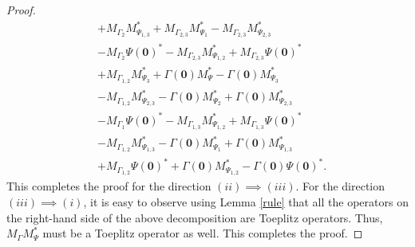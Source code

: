 \documentclass[12pt]{amsart}
\theoremstyle{definition}
\newcommand{\1}{{\mbox{\bf 1}}}
\begin{document}
\begin{proof}
\begin{align*}
&+ M_{\Gamma_2} M_{\Psi_{1,3}}^* + M_{\Gamma_{2,3}} M_{\Psi_{1}}^* - M_{\Gamma_{2,3}}  M_{\Psi_{2,3}}^*\\
&-M_{\Gamma_2} \Psi(\bm{0})^* - M_{\Gamma_{2,3}} M_{\Psi_{1,2}}^* + M_{\Gamma_{2,3}}  \Psi(\bm{0})^*\\
&+M_{\Gamma_{1,2}} M_{\Psi_3}^* + \Gamma(\bm{0}) M_{\Psi}^* - \Gamma(\bm{0}) M_{\Psi_3}^*\\
&-M_{\Gamma_{1,2}} M_{\Psi_{2,3}}^*  - \Gamma(\bm{0}) M_{\Psi_{2}}^* +  \Gamma(\bm{0}) M_{\Psi_{2,3}}^*\\
&-M_{\Gamma_{1}} \Psi(\bm{0})^*  - M_{\Gamma_{1,3}} M_{\Psi_{1,2}}^* +  M_{\Gamma_{1,3}} \Psi(\bm{0})^* \\
&-M_{\Gamma_{1,2}} M_{\Psi_{1,3}}^*  - \Gamma(\bm{0}) M_{\Psi_{1}}^* +  \Gamma(\bm{0}) M_{\Psi_{1,3}}^* \\
&+M_{\Gamma_{1,2}} \Psi(\bm{0})^*  + \Gamma(\bm{0}) M_{\Psi_{1,2}}^* -  \Gamma(\bm{0}) \Psi(\bm{0})^*.
\end{align*}
This completes the proof for the direction $(ii) \implies (iii)$. For the direction $(iii) \implies (i)$, it is easy to observe using Lemma \ref{rule} that all the operators on the right-hand side of the above decomposition are Toeplitz operators. Thus, $M_{\Gamma}M_{\Psi}^*$ must be a Toeplitz operator as well.
This completes the proof.
\end{proof}
\end{document}
